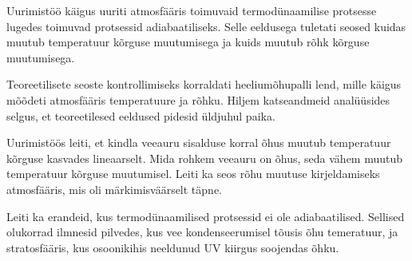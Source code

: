 \documentclass{trkut}%
\begin{document}
Uurimistöö käigus uuriti atmosfääris toimuvaid termodünaamilise protsesse lugedes toimuvad protsessid adiabaatiliseks. Selle eeldusega tuletati seosed kuidas muutub temperatuur kõrguse muutumisega ja kuids muutub rõhk kõrguse muutumisega.

Teoreetilisete seoste kontrollimiseks korraldati heeliumõhupalli lend, mille käigus mõõdeti atmosfääris temperatuure ja rõhku. Hiljem katseandmeid analüüsides selgus, et teoreetilesed eeldused pidesid üldjuhul paika.

Uurimistöös leiti, et kindla veeauru sisalduse korral õhus muutub temperatuur kõrguse kasvades lineaarselt. Mida rohkem veeauru on õhus, seda vähem muutub temperatuur kõrguse muutumisel. Leiti ka seos rõhu muutuse kirjeldamiseks atmosfääris, mis oli märkimisväärselt täpne.

Leiti ka erandeid, kus termodünaamilised protsessid ei ole adiabaatilised. Sellised olukorrad ilmnesid pilvedes, kus vee kondenseerumisel tõusis õhu temeratuur, ja stratosfääris, kus osoonikihis neeldunud UV kiirgus soojendas õhku.


\end{document}
